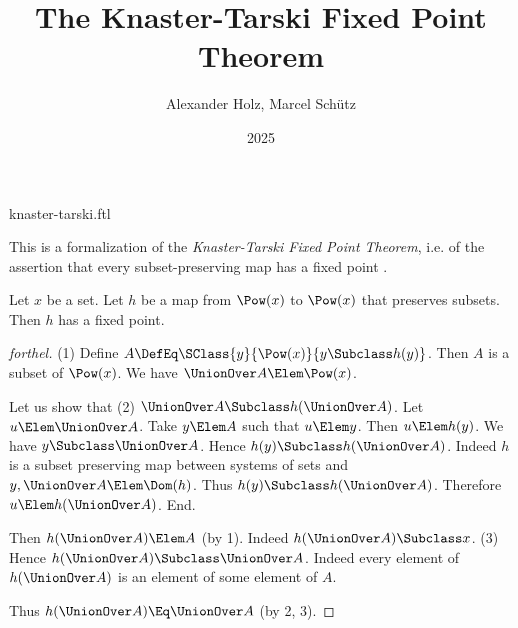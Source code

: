 \documentclass{stex}
\title{The Knaster-Tarski Fixed Point Theorem}
\author{Alexander Holz, Marcel Schütz}
\date{2025}
\begin{document}
\begin{smodule}{knaster-tarski.ftl}



\maketitle

\noindent This is a formalization of the \textit{Knaster-Tarski Fixed Point
Theorem}, i.e. of the assertion that every subset-preserving map has a fixed
point \cite{Schroeder2012}.

\begin{theorem}[forthel,title=Knaster-Tarski,name=Knaster-Tarski]
  Let $x$ be a set.
  Let $h$ be a map from $\Pow(x)$ to $\Pow(x)$ that preserves subsets.
  Then $h$ has a fixed point.
\end{theorem}
\begin{proof}[forthel]
  (1) Define $A \DefEq \SClass{y}{\Pow(x)}{y \Subclass h(y)}$.
  Then $A$ is a subset of $\Pow(x)$.
  We have $\UnionOver A \Elem \Pow(x)$.

  Let us show that (2) $\UnionOver A \Subclass h(\UnionOver A)$.
    Let $u \Elem \UnionOver A$.
    Take $y \Elem A$ such that $u \Elem y$.
    Then $u \Elem h(y)$.
    We have $y \Subclass \UnionOver A$.
    Hence $h(y) \Subclass h(\UnionOver A)$.
    Indeed $h$ is a subset preserving map between systems of sets and $y, \UnionOver A \Elem \Dom(h)$.
    Thus $h(y) \Subclass h(\UnionOver A)$.
    Therefore $u \Elem h(\UnionOver A)$.
  End.

  Then $h(\UnionOver A) \Elem A$ (by 1).
  Indeed $h(\UnionOver A) \Subclass x$.
  (3) Hence $h(\UnionOver A) \Subclass \UnionOver A$.
  Indeed every element of $h(\UnionOver A)$ is an element of some element of
  $A$.

  Thus $h(\UnionOver A) \Eq \UnionOver A$ (by 2, 3).
\end{proof}


\printbibliography
{}

\end{smodule}
\end{document}
